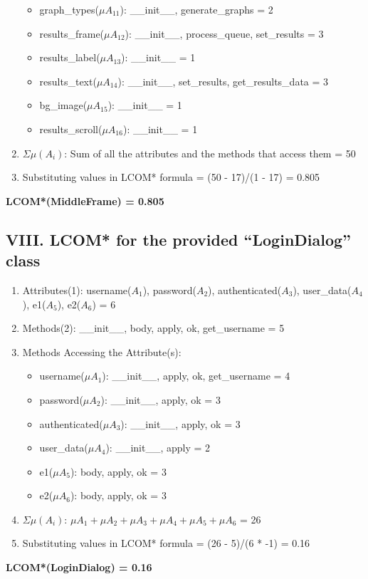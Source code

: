 \documentclass[english,12pt,a4paper]{report}
\begin{document}
\begin{enumerate}[label=\arabic*.]
\begin{itemize}[label={$\bullet$}]
			\item graph\_types(\(\mu A_{11}\)): \_\_init\_\_, generate\_graphs = 2
			\item results\_frame(\(\mu A_{12}\)): \_\_init\_\_, process\_queue, set\_results = 3
			\item results\_label(\(\mu A_{13}\)): \_\_init\_\_ = 1
			\item results\_text(\(\mu A_{14}\)): \_\_init\_\_, set\_results, get\_results\_data = 3
			\item bg\_image(\(\mu A_{15}\)): \_\_init\_\_ = 1
			\item results\_scroll(\(\mu A_{16}\)): \_\_init\_\_ = 1
		\end{itemize}
		\item \(\Sigma\mu(A_i)\): Sum of all the attributes and the methods that access them = 50
		\item Substituting values in LCOM* formula = (50 - 17)/(1 - 17) = 0.805
	\end{enumerate}
	\textbf{LCOM*(MiddleFrame) = 0.805}
	
	\subsection*{VIII. LCOM* for the provided ``LoginDialog'' class}
	\begin{enumerate}[label=\arabic*.]
		\item Attributes(1): username(\(A_1\)), password(\(A_2\)), authenticated(\(A_3\)), user\_data(\(A_4\)), e1(\(A_5\)), e2(\(A_6\)) = 6
		\item Methods(2): \_\_init\_\_, body, apply, ok, get\_username = 5
		\item Methods Accessing the Attribute(s):
		\begin{itemize}[label={$\bullet$}]
			\item username(\(\mu A_1\)): \_\_init\_\_, apply, ok, get\_username = 4
			\item password(\(\mu A_2\)): \_\_init\_\_, apply, ok = 3
			\item authenticated(\(\mu A_3\)): \_\_init\_\_, apply, ok = 3
			\item user\_data(\(\mu A_4\)): \_\_init\_\_, apply = 2
			\item e1(\(\mu A_5\)): body, apply, ok = 3
			\item e2(\(\mu A_6\)): body, apply, ok = 3
		\end{itemize}
		\item \(\Sigma\mu(A_i)\): \(\mu A_1 + \mu A_2 + \mu A_3 + \mu A_4 + \mu A_5 + \mu A_6\) = 26
		\item Substituting values in LCOM* formula = (26 - 5)/(6 * -1) = 0.16
	\end{enumerate}
	\textbf{LCOM*(LoginDialog) = 0.16}
	
\end{document}
